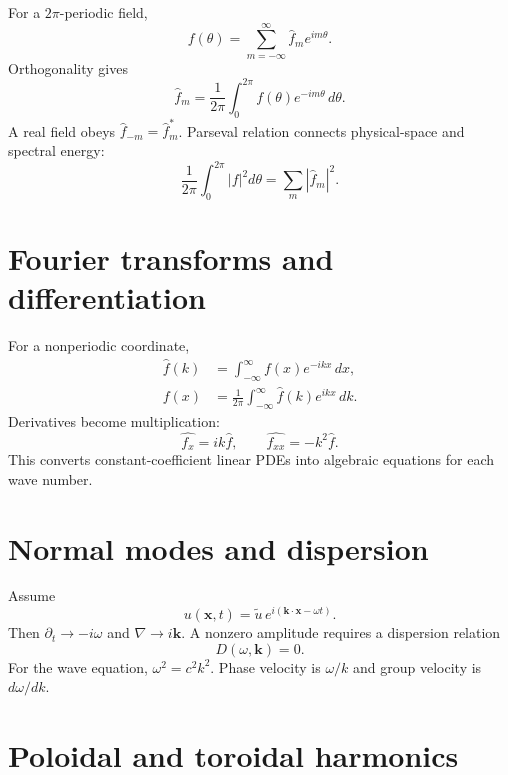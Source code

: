 \documentclass[11pt]{article}
\begin{document}
For a $2\pi$-periodic field,
\begin{equation}
f(\theta)=\sum_{m=-\infty}^{\infty}\hat f_me^{im\theta}.
\end{equation}
Orthogonality gives
\begin{equation}
\hat f_m=\frac{1}{2\pi}\int_0^{2\pi}f(\theta)e^{-im\theta}\,d\theta.
\end{equation}
A real field obeys $\hat f_{-m}=\hat f_m^*$. Parseval relation connects physical-space and spectral energy:
\begin{equation}
\frac{1}{2\pi}\int_0^{2\pi}|f|^2d\theta=\sum_m|\hat f_m|^2.
\end{equation}


\section{Fourier transforms and differentiation}

For a nonperiodic coordinate,
\begin{align}
\hat f(k)&=\int_{-\infty}^{\infty}f(x)e^{-ikx}\,dx,\\
f(x)&=\frac{1}{2\pi}\int_{-\infty}^{\infty}\hat f(k)e^{ikx}\,dk.
\end{align}
Derivatives become multiplication:
\begin{equation}
\widehat{f_x}=ik\hat f,\qquad
\widehat{f_{xx}}=-k^2\hat f.
\end{equation}
This converts constant-coefficient linear PDEs into algebraic equations for each wave number.


\section{Normal modes and dispersion}

Assume
\begin{equation}
u(\mathbf x,t)=\tilde u\,e^{i(\mathbf k\cdot\mathbf x-\omega t)}.
\end{equation}
Then $\partial_t\to-i\omega$ and $\nabla\to i\mathbf k$. A nonzero amplitude requires a dispersion relation
\begin{equation}
D(\omega,\mathbf k)=0.
\end{equation}
For the wave equation, $\omega^2=c^2k^2$. Phase velocity is $\omega/k$ and group velocity is $d\omega/dk$.


\section{Poloidal and toroidal harmonics}
\end{document}
